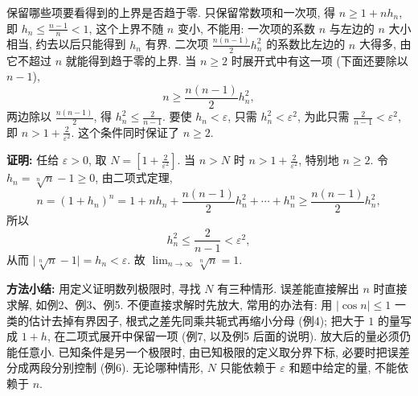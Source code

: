 \documentclass[UTF8,openany]{ctexbook}
\theoremstyle{chinesetextbook}
\newenvironment{cnproof}{\par\indent\textbf{证明:} \ignorespaces}{\par}
\begin{document}
保留哪些项要看得到的上界是否趋于零. 只保留常数项和一次项, 得 $n\ge1+nh_n$, 即 $\displaystyle h_n\le\frac{n-1}n<1$, 这个上界不随 $n$ 变小, 不能用: 一次项的系数 $n$ 与左边的 $n$ 大小相当, 约去以后只能得到 $h_n$ 有界. 二次项 $\displaystyle\frac{n(n-1)}2h_n^2$ 的系数比左边的 $n$ 大得多, 由它不超过 $n$ 就能得到趋于零的上界. 当 $n\ge2$ 时展开式中有这一项 (下面还要除以 $n-1$),
\[
n\ge\frac{n(n-1)}2h_n^2,
\]
两边除以 $\displaystyle\frac{n(n-1)}2$, 得 $\displaystyle h_n^2\le\frac2{n-1}$. 要使 $h_n<\varepsilon$, 只需 $h_n^2<\varepsilon^2$, 为此只需 $\displaystyle\frac2{n-1}<\varepsilon^2$, 即 $\displaystyle n>1+\frac2{\varepsilon^2}$. 这个条件同时保证了 $n\ge2$.
\begin{cnproof}
任给 $\varepsilon>0$, 取 $\displaystyle N=\left[1+\frac2{\varepsilon^2}\right]$. 当 $n>N$ 时 $\displaystyle n>1+\frac2{\varepsilon^2}$, 特别地 $n\ge2$. 令 $h_n=\sqrt[n]n-1\ge0$, 由二项式定理,
\[
n=(1+h_n)^n=1+nh_n+\frac{n(n-1)}2h_n^2+\cdots+h_n^n\ge\frac{n(n-1)}2h_n^2,
\]
所以
\[
h_n^2\le\frac2{n-1}<\varepsilon^2,
\]
从而 $\bigl|\sqrt[n]n-1\bigr|=h_n<\varepsilon$. 故 $\displaystyle\lim_{n\to\infty}\sqrt[n]n=1$.
\end{cnproof}
\par\indent\textbf{方法小结:} 用定义证明数列极限时, 寻找 $N$ 有三种情形. 误差能直接解出 $n$ 时直接求解, 如例2、例3、例5. 不便直接求解时先放大, 常用的办法有: 用 $|\cos n|\le1$ 一类的估计去掉有界因子, 根式之差先同乘共轭式再缩小分母 (例4); 把大于 $1$ 的量写成 $1+h$, 在二项式展开中保留一项 (例7, 以及例5 后面的说明). 放大后的量必须仍能任意小. 已知条件是另一个极限时, 由已知极限的定义取分界下标, 必要时把误差分成两段分别控制 (例6). 无论哪种情形, $N$ 只能依赖于 $\varepsilon$ 和题中给定的量, 不能依赖于 $n$.
\end{document}

